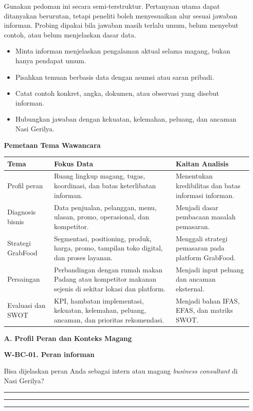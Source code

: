 \documentclass[10pt,a4paper]{article}
\newcommand{\sectionbar}[1]{%
  \Needspace{4\baselineskip}
  \vspace{4mm}
  \noindent\colorbox{Soft}{%
    \parbox{\dimexpr\linewidth-2\fboxsep\relax}{%
      \large\bfseries\textcolor{Primary}{#1}
    }%
  }\par\vspace{2mm}
}
\newcommand{\probe}[1]{%
  \vspace{1mm}
  \noindent{\small\textbf{\textcolor{Accent}{Probing:}} \textcolor{TextGray}{#1}}\par
}
\newcommand{\answerline}{%
  \par\vspace{0.8mm}
  \noindent\textcolor{LineGray}{\rule{\linewidth}{0.35pt}}\par\vspace{2.8mm}
}
\newcommand{\questionblock}[4]{%
  \Needspace{8\baselineskip}
  \noindent\textbf{\textcolor{Primary}{#1. #2}}\par
  \noindent #3\par
  \probe{#4}
  \answerline\answerline\answerline
}
\begin{document}
Gunakan pedoman ini secara semi-terstruktur. Pertanyaan utama dapat ditanyakan berurutan, tetapi peneliti boleh menyesuaikan alur sesuai jawaban informan. Probing dipakai bila jawaban masih terlalu umum, belum menyebut contoh, atau belum menjelaskan dasar data.

\begin{itemize}[leftmargin=*,itemsep=2pt,topsep=2pt]
  \item Minta informan menjelaskan pengalaman aktual selama magang, bukan hanya pendapat umum.
  \item Pisahkan temuan berbasis data dengan asumsi atau saran pribadi.
  \item Catat contoh konkret, angka, dokumen, atau observasi yang disebut informan.
  \item Hubungkan jawaban dengan kekuatan, kelemahan, peluang, dan ancaman Nasi Gerilya.
\end{itemize}

\sectionbar{Pemetaan Tema Wawancara}

\begin{tabularx}{\linewidth}{|p{31mm}|Y|Y|}
\hline
\textbf{\textcolor{Primary}{Tema}} & \textbf{\textcolor{Primary}{Fokus Data}} & \textbf{\textcolor{Primary}{Kaitan Analisis}} \\ \hline
Profil peran & Ruang lingkup magang, tugas, koordinasi, dan batas keterlibatan informan. & Menentukan kredibilitas dan batas informasi informan. \\ \hline
Diagnosis bisnis & Data penjualan, pelanggan, menu, ulasan, promo, operasional, dan kompetitor. & Menjadi dasar pembacaan masalah pemasaran. \\ \hline
Strategi GrabFood & Segmentasi, positioning, produk, harga, promo, tampilan toko digital, dan proses layanan. & Menggali strategi pemasaran pada platform GrabFood. \\ \hline
Persaingan & Perbandingan dengan rumah makan Padang atau kompetitor makanan sejenis di sekitar lokasi dan platform. & Menjadi input peluang dan ancaman eksternal. \\ \hline
Evaluasi dan SWOT & KPI, hambatan implementasi, kekuatan, kelemahan, peluang, ancaman, dan prioritas rekomendasi. & Menjadi bahan IFAS, EFAS, dan matriks SWOT. \\ \hline
\end{tabularx}

\sectionbar{A. Profil Peran dan Konteks Magang}

\questionblock{W-BC-01}{Peran informan}{Bisa dijelaskan peran Anda sebagai intern atau magang \textit{business consultant} di Nasi Gerilya?}{Sejak kapan terlibat, tugas utama apa yang dikerjakan, dan dengan siapa paling sering berkoordinasi?}
\end{document}
